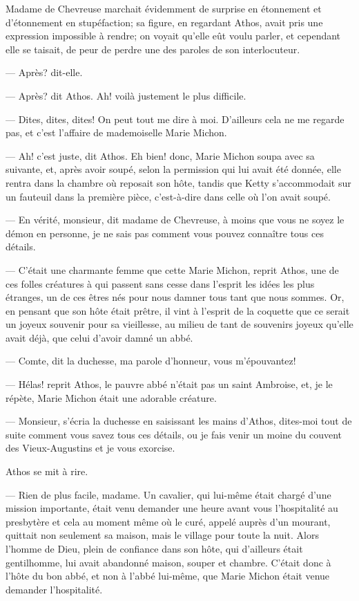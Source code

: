 Madame de Chevreuse marchait évidemment de surprise en étonnement et d'étonnement en stupéfaction; sa figure, en regardant Athos, avait pris une expression impossible à rendre; on voyait qu'elle eût voulu parler, et cependant elle se taisait, de peur de perdre une des paroles de son interlocuteur.

— Après? dit-elle.

— Après? dit Athos. Ah! voilà justement le plus difficile.

— Dites, dites, dites! On peut tout me dire à moi. D'ailleurs cela ne me regarde pas, et c'est l'affaire de mademoiselle Marie Michon.

— Ah! c'est juste, dit Athos. Eh bien! donc, Marie Michon soupa avec sa suivante, et, après avoir soupé, selon la permission qui lui avait été donnée, elle rentra dans la chambre où reposait son hôte, tandis que Ketty s'accommodait sur un fauteuil dans la première pièce, c'est-à-dire dans celle où l'on avait soupé.

— En vérité, monsieur, dit madame de Chevreuse, à moins que vous ne soyez le démon en personne, je ne sais pas comment vous pouvez connaître tous ces détails.

— C'était une charmante femme que cette Marie Michon, reprit Athos, une de ces folles créatures à qui passent sans cesse dans l'esprit les idées les plus étranges, un de ces êtres nés pour nous damner tous tant que nous sommes. Or, en pensant que son hôte était prêtre, il vint à l'esprit de la coquette que ce serait un joyeux souvenir pour sa vieillesse, au milieu de tant de souvenirs joyeux qu'elle avait déjà, que celui d'avoir damné un abbé.

— Comte, dit la duchesse, ma parole d'honneur, vous m'épouvantez!

— Hélas! reprit Athos, le pauvre abbé n'était pas un saint Ambroise, et, je le répète, Marie Michon était une adorable créature.

— Monsieur, s'écria la duchesse en saisissant les mains d'Athos, dites-moi tout de suite comment vous savez tous ces détails, ou je fais venir un moine du couvent des Vieux-Augustins et je vous exorcise.

Athos se mit à rire.

— Rien de plus facile, madame. Un cavalier, qui lui-même était chargé d'une mission importante, était venu demander une heure avant vous l'hospitalité au presbytère et cela au moment même où le curé, appelé auprès d'un mourant, quittait non seulement sa maison, mais le village pour toute la nuit. Alors l'homme de Dieu, plein de confiance dans son hôte, qui d'ailleurs était gentilhomme, lui avait abandonné maison, souper et chambre. C'était donc à l'hôte du bon abbé, et non à l'abbé lui-même, que Marie Michon était venue demander l'hospitalité.

